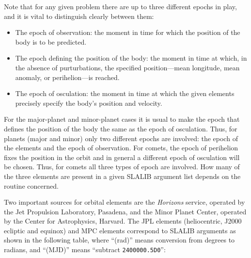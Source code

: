 \documentclass[11pt,twoside,nolof]{starlink}
\begin{document}
Note that for any given problem there are up to three different
epochs in play, and it is vital to distinguish clearly between
them:
\begin{itemize}
\item The epoch of observation:  the moment in time for which the
      position of the body is to be predicted.
\item The epoch defining the position of the body:  the moment in time
      at which, in the absence of purturbations, the specified
      position---mean longitude, mean anomaly, or perihelion---is
      reached.
\item The epoch of osculation:  the moment in time at which the given
      elements precisely specify the body's position and velocity.
\end{itemize}

For the major-planet and minor-planet cases it is usual to make
the epoch that defines the position of the body the same as the
epoch of osculation.  Thus, for planets (major and
minor) only two different epochs are
involved:  the epoch of the elements and the epoch of observation.
For comets, the epoch of perihelion fixes the position in the
orbit and in general a different epoch of osculation will be
chosen.  Thus, for comets all three types of epoch are involved.
How many of the three elements are present in a given SLALIB
argument list depends on the routine concerned.

Two important sources for orbital elements are the \textit{Horizons}\/
service, operated by the Jet Propulsion Laboratory, Pasadena,
and the Minor Planet Center, operated by the Center for
Astrophysics, Harvard.
The JPL elements (heliocentric, J2000 ecliptic and
equinox) and MPC elements
correspond to SLALIB arguments as shown in the following table,
where ``(rad)'' means conversion from degrees to radians, and
``(MJD)'' means ``subtract \texttt{2400000.5D0}'':

\vspace{2ex}
\end{document}
